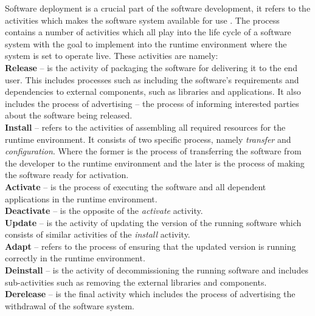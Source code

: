 Software deployment is a crucial part of the software development, it refers to the activities which makes the software system available for use \cite{carzaniga1998characterization}. The process contains a number of activities which all play into the life cycle of a software system with the goal to implement into the runtime environment where the system is set to operate live. These activities are namely: \\

\textbf{Release} – is the activity of packaging the software for delivering it to the end user. This includes processes such as including the software's requirements and dependencies to external components, such as libraries and applications. It also includes the process of advertising – the process of informing interested parties about the software being released.\\
\textbf{Install} – refers to the activities of assembling all required resources for the runtime environment. It consists of two specific process, namely \textit{transfer} and \textit{configuration}. Where the former is the process of transferring the software from the developer to the runtime environment and the later is the process of making the software ready for activation.\\
\textbf{Activate} – is the process of executing the software and all dependent applications in the runtime environment.\\
\textbf{Deactivate} – is the opposite of the \textit{activate} activity.\\
\textbf{Update} – is the activity of updating the version of the running software which consists of similar activities of the \textit{install} activity.\\
\textbf{Adapt} – refers to the process of ensuring that the updated version is running correctly in the runtime environment.\\
\textbf{Deinstall} – is the activity of decommissioning the running software and includes sub-activities such as removing the external libraries and components.\\
\textbf{Derelease} – is the final activity which includes the process of advertising the withdrawal of the software system.\\

